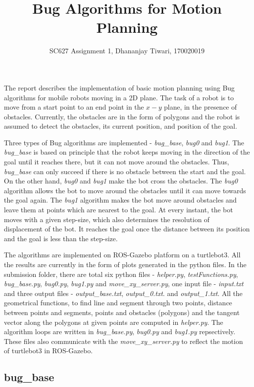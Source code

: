 \documentclass[a4paper, 11pt, letterpaper]{article}
\title{Bug Algorithms for Motion Planning}
\author{SC627 Assignment 1, Dhananjay Tiwari, 170020019}
\begin{document}
\maketitle

The report describes the implementation of basic motion planning using Bug algorithms for mobile robots moving in a 2D plane. The task of a robot is to move from a start point to an end point in the $x-y$ plane, in the presence of obstacles. Currently, the obstacles are in the form of polygons and the robot is assumed to detect the obstacles, its current position, and position of the goal.

Three types of Bug algorithms are implemented - \textit{bug\_base}, \textit{bug0} and \textit{bug1}. The \textit{bug\_base} is based on principle that the robot keeps moving in the direction of the goal until it reaches there, but it can not move around the obstacles. Thus, \textit{bug\_base} can only succeed if there is no obstacle between the start and the goal. On the other hand, \textit{bug0} and \textit{bug1} make the bot cross the obstacles. The \textit{bug0} algorithm allows the bot to move around the obstacles until it can move towards the goal again. The \textit{bug1} algorithm makes the bot move around obstacles and leave them at points which are nearest to the goal. At every instant, the bot moves with a given step-size, which also determines the resolution of displacement of the bot. It reaches the goal once the distance between its position and the goal is less than the step-size.  

The algorithms are implemented on ROS-Gazebo platform on a turtlebot3. All the results are currently in the form of plots generated in the python files. In the submission folder, there are total six python files - \textit{helper.py}, \textit{testFunctions.py}, \textit{bug\_base.py}, \textit{bug0.py}, \textit{bug1.py} and \textit{move\_xy\_server.py}, one input file - \textit{input.txt} and three output files - \textit{output\_base.txt}, \textit{output\_0.txt}. and \textit{output\_1.txt}. All the geometrical functions, to find line and segment through two points, distance between points and segments, points and obstacles (polygons) and the tangent vector along the polygons at given points are computed in \textit{helper.py}. The algorithm loops are written in \textit{bug\_base.py}, \textit{bug0.py} and \textit{bug1.py} repsectively. These files also communicate with the \textit{move\_xy\_server.py} to reflect the motion of turtlebot3 in ROS-Gazebo.

\subsection{bug\_base}
\end{document}
